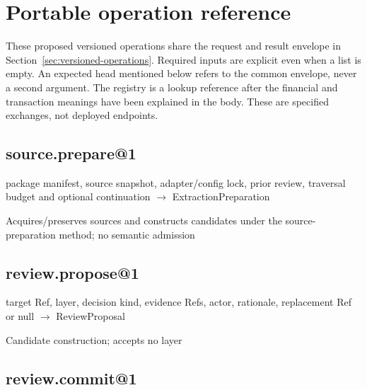 \chapter{Portable operation reference}
\label{app:portable-interfaces}

These proposed versioned operations share the request and result envelope in
Section~\ref{sec:versioned-operations}. Required inputs are explicit even when
a list is empty. An expected head mentioned below refers to the common envelope,
never a second argument. The registry is a lookup reference after the financial
and transaction meanings have been explained in the body. These are specified
exchanges, not deployed endpoints.











\hypertarget{source.prepare1}{%
\section{source.prepare@1}\label{source.prepare1}}

package manifest, source snapshot, adapter/config lock, prior review, traversal budget and optional continuation \ensuremath{\rightarrow} ExtractionPreparation

Acquires/preserves sources and constructs candidates under the source-preparation method; no semantic admission

\hypertarget{review.propose1}{%
\section{review.propose@1}\label{review.propose1}}

target Ref, layer, decision kind, evidence Refs, actor, rationale, replacement Ref or null \ensuremath{\rightarrow} ReviewProposal

Candidate construction; accepts no layer

\hypertarget{review.commit1}{%
\section{review.commit@1}\label{review.commit1}}

